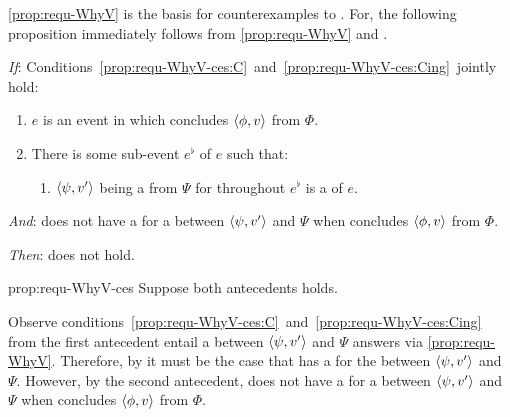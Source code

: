 \begin{note}
  \autoref{prop:requ-WhyV} is the basis for counterexamples to \issueConstraint{}.
  For, the following proposition immediately follows from \autoref{prop:requ-WhyV} and \issueConstraint{}.

  \begin{proposition}
    \label{prop:requ-WhyV-ces}
    \vspace{-\baselineskip}
    \begin{itenum}
    \item[\emph{If}:]
      Conditions~\ref{prop:requ-WhyV-ces:C}~and~\ref{prop:requ-WhyV-ces:Cing}~jointly hold:
      \begin{enumerate}[label=\arabic*., ref=(\arabic*)]
      \item
        \label{prop:requ-WhyV-ces:C}
        \(e\) is an event in which \vAgent{} concludes \(\langle \phi, v \rangle\) from \(\Phi\).
      \item
        \label{prop:requ-WhyV-ces:Cing}
        There is some sub-event \(e^{\flat}\) of \(e\) such that:
        \begin{enumerate}[label=\alph*., ref=(\arabic{enumi}\alph*)]
        \item
          \label{prop:requ-WhyV-ces:Cing:requ}
          \(\langle \psi, v' \rangle\) being a \fc{} from \(\Psi\) for \vAgent{} throughout \(e^{\flat}\) is a \requ{} of \(e\).
        \end{enumerate}
      \end{enumerate}
    \item[\emph{And}:]
      \label{prop:requ-WhyVCes:noW}
      \vAgent{} does not have a \wit{} for a \ros{} between \(\langle \psi, v' \rangle\) and \(\Psi\) when \vAgent{} concludes \(\langle \phi, v \rangle\) from \(\Phi\).
    \item[\emph{Then}:]
      \issueConstraint{} does not hold.
    \end{itenum}
    \vspace{-\baselineskip}
  \end{proposition}

  \begin{argument}{prop:requ-WhyV-ces}
    Suppose both antecedents holds.

    Observe conditions~\ref{prop:requ-WhyV-ces:C}~and~\ref{prop:requ-WhyV-ces:Cing} from the first antecedent entail a  between \(\langle \psi, v' \rangle\) and \(\Psi\) answers \qWhyV{} via \autoref{prop:requ-WhyV}.
    Therefore, by \issueConstraint{} it must be the case that \vAgent{} has a \wit{} for the \ros{} between \(\langle \psi, v' \rangle\) and \(\Psi\).
    However, by the second antecedent, \vAgent{} does not have a \wit{} for a \ros{} between \(\langle \psi, v' \rangle\) and \(\Psi\) when \vAgent{} concludes \(\langle \phi, v \rangle\) from \(\Phi\).
  \end{argument}
\end{note}

